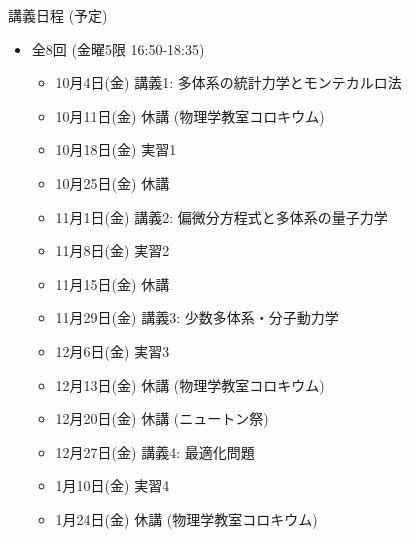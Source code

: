 \begin{frame}[t]{講義日程 (予定)}
  \begin{itemize}
  \item 全8回 (金曜5限 16:50-18:35)
    \begin{itemize}
    \item 10月4日(金) 講義1: 多体系の統計力学とモンテカルロ法
    \item {\color{gray} 10月11日(金) 休講 (物理学教室コロキウム)}
    \item 10月18日(金) 実習1
    \item {\color{gray} 10月25日(金) 休講}
    \item 11月1日(金) 講義2: 偏微分方程式と多体系の量子力学
    \item 11月8日(金) 実習2
    \item {\color{gray} 11月15日(金) 休講}
    \item 11月29日(金) 講義3: 少数多体系・分子動力学
    \item 12月6日(金) 実習3
    \item {\color{gray} 12月13日(金) 休講 (物理学教室コロキウム)}
    \item {\color{gray} 12月20日(金) 休講 (ニュートン祭)}
    \item 12月27日(金) 講義4: 最適化問題
    \item 1月10日(金) 実習4
    \item {\color{gray} 1月24日(金) 休講 (物理学教室コロキウム)}
    \end{itemize}
  \end{itemize}
\end{frame}
